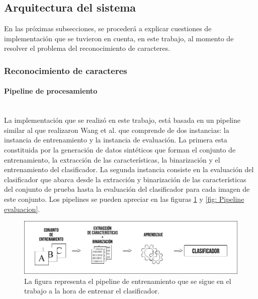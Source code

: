 \subsection{Arquitectura del sistema}
\label{subsection:impl_propia}

	En las próximas subsecciones, se procederá a explicar cuestiones de implementación que se tuvieron en cuenta, en este trabajo, al momento de resolver el problema del reconocimiento de caracteres.

	\subsubsection{Reconocimiento de caracteres}
		\label{subsubsection:recon-caracteres}
	
	
	\paragraph{Pipeline de procesamiento} ~\\

			La implementación que se realizó en este trabajo, está basada en un pipeline similar al que realizaron Wang et al. que comprende de dos instancias: la instancia de entrenamiento y la instancia de evaluación. La primera esta constituida por la generación de datos sintéticos que forman el conjunto de entrenamiento, la extracción de las características, la binarización y el entrenamiento del clasificador. La segunda instancia consiste en la evaluación del clasificador que abarca desde la extracción y binarización de las características del conjunto de prueba hasta la evaluación del clasificador para cada imagen de este conjunto. Los pipelines se pueden apreciar en las figuras \ref{fig: Pipeline entrenamiento} y \ref{fig: Pipeline evaluacion}.

			\begin{figure}[htbp]
				\centering
				\centerline{
					\includegraphics[scale=0.4]{img/pipeline_entrenamiento.jpg}
				}
				\caption[Pipeline de entrenamiento]{La figura representa el pipeline de entrenamiento que se sigue en el trabajo a la hora de entrenar el clasificador.}
				\label{fig: Pipeline entrenamiento}
			\end{figure}
			
